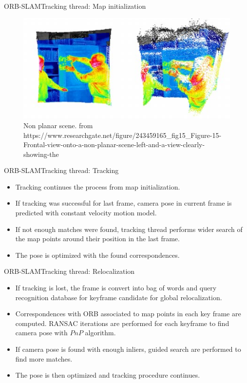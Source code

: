 \documentclass{beamer}
\begin{document}
\begin{frame}{ORB-SLAM}{Tracking thread: Map initialization}
  \begin{figure}
\includegraphics[scale=0.7]{Figure/non_planar}
\caption{Non planar scene. from https://www.researchgate.net/figure/243459165_fig15_Figure-15-Frontal-view-onto-a-non-planar-scene-left-and-a-view-clearly-showing-the}
\end{figure}
\end{frame}

\begin{frame}{ORB-SLAM}{Tracking thread: Tracking}
  \begin{itemize}
      \item{
      Tracking continues the process from map initialization.
      }
      \item{
      If tracking was successful for last frame, camera pose in current frame is predicted with constant velocity motion model.
      }
      \item{
      If not enough matches were found, tracking thread performs wider search of the map points around their position in the last frame.
      }
      \item{
      The pose is optimized with the found correspondences.
      }
  \end{itemize}  
\end{frame}

\begin{frame}{ORB-SLAM}{Tracking thread: Relocalization}
    \begin{itemize}
        \item{
        If tracking is lost, the frame is convert into bag of words and query recognition database for keyframe candidate for global relocalization.
        }
        \item{
        Correspondences with ORB associated to map points in each key frame are computed. RANSAC iterations are performed for each keyframe to find camera pose with $PnP$ algorithm.
        }
        \item{
        If camera pose is found with enough inliers, guided search are performed to find more matches.
        }
        \item{
        The pose is then optimized and tracking procedure continues.
        }
    \end{itemize}    
\end{frame}
\end{document}
